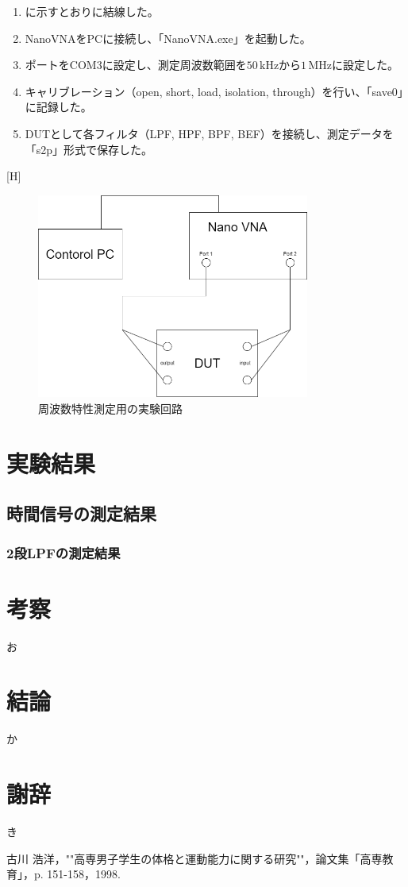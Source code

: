 \documentclass[11pt,dvipdfmx]{jarticle}
\begin{document}
\begin{enumerate}
  \item {}に示すとおりに結線した。
  \item NanoVNAをPCに接続し、「NanoVNA.exe」を起動した。
  \item ポートをCOM3に設定し、測定周波数範囲を$50\,\mathrm{kHz}$から$1\,\mathrm{MHz}$に設定した。
  \item キャリブレーション（open, short, load, isolation, through）を行い、「save0」に記録した。
  \item DUTとして各フィルタ（LPF, HPF, BPF, BEF）を接続し、測定データを「s2p」形式で保存した。
\end{enumerate}[H]
\begin{figure}
  \centering
  \includegraphics[width=0.8\textwidth]{fig/VNA.drawio.png}
  \caption{周波数特性測定用の実験回路}
  \label{fig:実験回路2}
\end{figure}

\section{実験結果}
\subsection{時間信号の測定結果}
\subsubsection{2段LPFの測定結果}


\section{考察}
お

\section{結論}
か

\section{謝辞}
き


\begin{thebibliography}{99}
 古川 浩洋，""高専男子学生の体格と運動能力に関する研究""，論文集「高専教育」，p. 151-158，1998.
\end{thebibliography}
\end{document}
